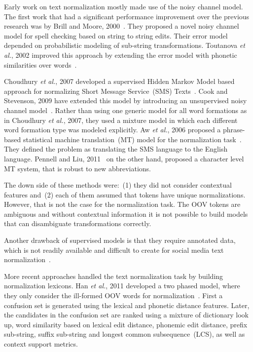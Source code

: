 \documentclass[a4paper,onesided,12pt]{report}
\begin{document}
Early work on text normalization mostly made use of the noisy channel model. The first work that had a significant performance improvement over the previous research was by Brill and Moore, 2000~\cite{Brill:2000:IEM:1075218.1075255}. They proposed a novel noisy channel model for spell checking based on string to string edits. Their error model depended on probabilistic modeling of sub-string transformations. Toutanova \textit{et al.}, 2002 improved this approach by extending the error model with phonetic similarities over words~\cite{Toutanova:2002:PMI:1073083.1073109}.

Choudhury \textit{et al.}, 2007 developed a supervised Hidden Markov Model based approach for normalizing Short Message Service~(SMS) Texts~\cite{Choudhury:2007:IMS:1326044.1326048}. Cook and Stevenson, 2009 have extended this model by introducing an unsupervised noisy channel model~\cite{Cook:2009:UMT:1642011.1642021}. Rather than using one generic model for all word formations as in Choudhury \textit{et al.}, 2007, they used a mixture model in which each different word formation type was modeled explicitly. Aw \textit{et al.}, 2006 proposed a phrase-based statistical machine translation~(MT) model for the normalization task~\cite{Aw:2006:PSM:1273073.1273078}. They defined the problem as translating the SMS language to the English language. Pennell and Liu, 2011~\cite{pennell2011character} on the other hand, proposed a character level MT system, that is robust to new abbreviations.

The down side of these methods were:~(1) they did not consider contextual features and~(2) each of them assumed that tokens have unique normalizations. However, that is not the case for the normalization task. The OOV tokens are ambiguous and without contextual information it is not possible to build models that can disambiguate transformations correctly.

Another drawback of supervised models is that they require annotated data, which is not readily available and difficult to create for social media text normalization~\cite{DBLP:conf/emnlp/YangE13}.

More recent approaches handled the text normalization task by building normalization lexicons. Han \textit{et al.}, 2011 developed a two phased model, where they only consider the ill-formed OOV words for normalization~\cite{Han:2011:LNS:2002472.2002520}. First a confusion set is generated using the lexical and phonetic distance features. Later, the candidates in the confusion set are ranked using a mixture of dictionary look up, word similarity based on lexical edit distance, phonemic edit distance, prefix sub-string, suffix sub-string and longest common subsequence~(LCS), as well as context support metrics.
\end{document}
